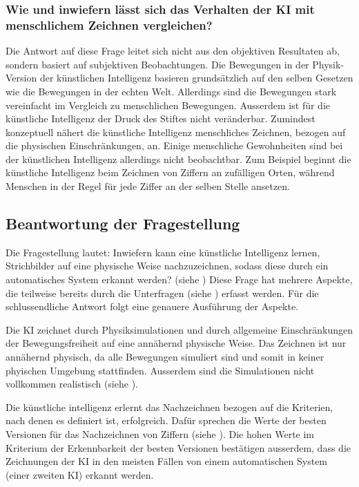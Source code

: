 \subsubsection*{Wie und inwiefern lässt sich das Verhalten der KI mit menschlichem Zeichnen vergleichen?}\label{subsub:d_frage_unter_6}
Die Antwort auf diese Frage leitet sich nicht aus den objektiven Resultaten ab,
sondern basiert auf subjektiven Beobachtungen. Die Bewegungen in der
Physik-Version der künstlichen Intelligenz basieren grundsätzlich auf den selben
Gesetzen wie die Bewegungen in der echten Welt. Allerdings sind die Bewegungen
stark vereinfacht im Vergleich zu menschlichen Bewegungen. Ausserdem ist für die
künstliche Intelligenz der Druck des Stiftes nicht veränderbar. Zumindest
konzeptuell nähert die künstliche Intelligenz menschliches Zeichnen,
bezogen auf die physischen Einschränkungen, an. Einige menschliche Gewohnheiten
sind bei der künstlichen Intelligenz allerdings nicht beobachtbar. Zum Beispiel
beginnt die künstliche Intelligenz beim Zeichnen von Ziffern an zufälligen
Orten, während Menschen in der Regel für jede Ziffer an der selben Stelle
ansetzen.


\subsection{Beantwortung der Fragestellung}\label{sub:d_frage_frag}
Die Fragestellung lautet: Inwiefern kann eine künstliche Intelligenz lernen,
Strichbilder auf eine physische Weise nachzuzeichnen, sodass diese durch ein
automatisches System erkannt werden? (siehe ) Diese Frage
hat mehrere Aspekte, die teilweise bereits durch die Unterfragen (siehe
) erfasst werden. Für die schlussendliche Antwort
folgt eine genauere Ausführung der Aspekte.

Die KI zeichnet durch Physiksimulationen und durch allgemeine Einschränkungen
der Bewegungsfreiheit auf eine annähernd physische Weise. Das Zeichnen ist nur
annähernd physisch, da alle Bewegungen simuliert sind und somit in keiner
phyischen Umgebung stattfinden. Ausserdem sind die Simulationen nicht vollkommen
realistisch (siehe ).

Die künstliche intelligenz erlernt das Nachzeichnen bezogen auf die Kriterien,
nach denen es definiert ist, erfolgreich. Dafür sprechen die Werte der besten
Versionen für das Nachzeichnen von Ziffern (siehe ). Die
hohen Werte im Kriterium der Erkennbarkeit der besten Versionen bestätigen
ausserdem, dass die Zeichnungen der KI in den meisten Fällen von einem
automatischen System (einer zweiten KI) erkannt werden.

